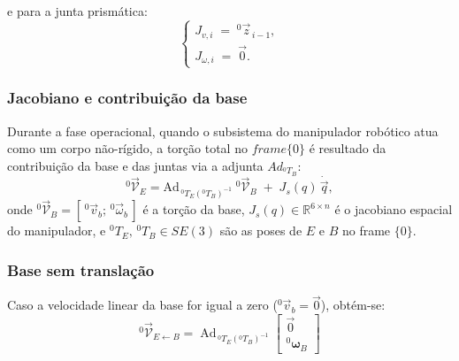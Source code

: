 e para a junta prismática:
\begin{equation}
    \label{eq:jac_columns_prismatica}
\begin{cases}
J_{v,i} \;=\; {}^{0}\!\vec{z}_{\,i-1}, \\
J_{\omega,i} \;=\; \vec{0}.
\end{cases}
\end{equation}
%
%
%
\subsubsection{Jacobiano e contribuição da base}
Durante a fase operacional, quando o subsistema do manipulador robótico atua como um corpo não-rígido,
a torção total no $frame \{0\}$ é resultado da contribuição da base e das juntas via a adjunta $Ad_{{}^{0}T_{B}}$:
\begin{equation}
{}^{0}\!\vec{\mathcal V}_E
=
\mathrm{Ad}_{\,^{0}\!T_E (^{0}\!T_B)^{-1}}\;{}^{0}\!\vec{\mathcal V}_B
\;+\;
J_s(q)\,\dot{\vec q},
\label{eq:VE_base_movel}
\end{equation}
onde $^{0}\!\vec{\mathcal V}_B=[\,^{0}\!\vec v_b;\,^{0}\!\vec\omega_b\,]$ é a torção da base, $J_s(q)\in\mathbb{R}^{6\times n}$ é o jacobiano espacial do manipulador, e $^{0}\!T_E,\,^{0}\!T_B\in SE(3)$ são as poses de $E$ e $B$ no frame $\{0\}$.

\subsubsection{Base sem translação}
Caso a velocidade linear da base for igual a zero (${}^{0}\!\vec{v}_{b}=\vec{0}$), obtém-se:
\begin{equation}
\label{eq:jac_base_particular1}
{}^{0}\!\vec{\mathcal V}_{E \leftarrow B}=
\operatorname{Ad}_{\,{}^{0}\!T_E \left({}^{0}\!T_B\right)^{-1}}
\begin{bmatrix}
\vec{0}         \\
{}^{0}\!\boldsymbol{\omega}_{B}
\end{bmatrix}
\end{equation}

